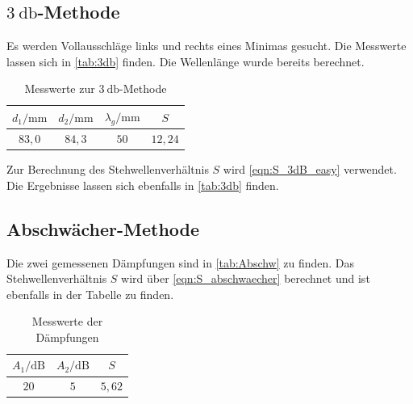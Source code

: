 \subsection{$\qty{3}{\decibel}$-Methode}

Es werden Vollausschläge links und rechts eines Minimas gesucht. Die Messwerte lassen sich in \autoref{tab:3db} finden. Die Wellenlänge wurde bereits berechnet.
\begin{table}[htbp] 
    \centering 
    \begin{tabular}{c  c c c} 
        \toprule $d_1 / \mathrm{mm}$ & $d_2 / \mathrm{mm}$ &  $\lambda_g  / \mathrm{mm}$ & $S$\\ 
        \midrule 
        $83,0$ &  $84,3$ & $50$ & $12,24$ \\
        \bottomrule 
    \end{tabular} 
    \caption[Tabelle]{Messwerte zur $\qty{3}{\decibel}$-Methode} 
    \label{tab:3db} 
\end{table}
Zur Berechnung des Stehwellenverhältnis $S$ wird \autoref{eqn:S_3dB_easy} verwendet. Die Ergebnisse lassen sich ebenfalls in \autoref{tab:3db} finden.

\subsection{Abschwächer-Methode}

Die zwei gemessenen Dämpfungen sind in \autoref{tab:Abschw} zu finden. Das Stehwellenverhältnis $S$ wird über \autoref{eqn:S_abschwaecher} berechnet und ist 
ebenfalls in der Tabelle zu finden.
\begin{table}[htbp] 
    \centering 
    \begin{tabular}{c  c c} 
        \toprule $A_1 / \mathrm{dB}$ & $A_2 / \mathrm{dB}$ & $S$\\ 
        \midrule 
        $20$ &  $5$ & $5,62$ \\
        \bottomrule 
    \end{tabular} 
    \caption[Tabelle]{Messwerte der Dämpfungen} 
    \label{tab:Abschw} 
\end{table}
